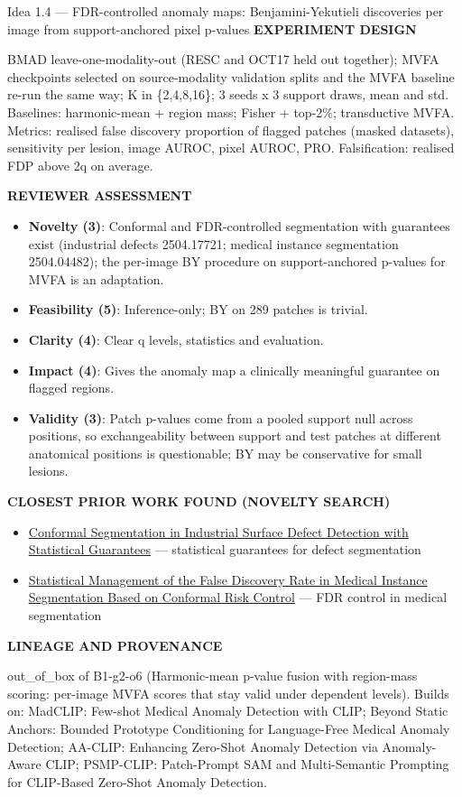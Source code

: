 \documentclass[11pt,a4paper]{article}
\newcommand{\lbl}[1]{{\sffamily\footnotesize\bfseries\color{muted}\MakeUppercase{#1}}\par}
\begin{document}
\begin{ideabox}{Idea 1.4 — FDR-controlled anomaly maps: Benjamini-Yekutieli discoveries per image from support-anchored pixel p-values}
\lbl{Experiment design}BMAD leave-one-modality-out (RESC and OCT17 held out together); MVFA checkpoints selected on source-modality validation splits and the MVFA baseline re-run the same way; K in \{2,4,8,16\}; 3 seeds x 3 support draws, mean and std. Baselines: harmonic-mean + region mass; Fisher + top-2\%; transductive MVFA. Metrics: realised false discovery proportion of flagged patches (masked datasets), sensitivity per lesion, image AUROC, pixel AUROC, PRO. Falsification: realised FDP above 2q on average.

\lbl{Reviewer assessment}\begin{itemize}[leftmargin=1.2em,itemsep=1pt,topsep=2pt]
\item \textbf{Novelty (3)}: Conformal and FDR-controlled segmentation with guarantees exist (industrial defects 2504.17721; medical instance segmentation 2504.04482); the per-image BY procedure on support-anchored p-values for MVFA is an adaptation.
\item \textbf{Feasibility (5)}: Inference-only; BY on 289 patches is trivial.
\item \textbf{Clarity (4)}: Clear q levels, statistics and evaluation.
\item \textbf{Impact (4)}: Gives the anomaly map a clinically meaningful guarantee on flagged regions.
\item \textbf{Validity (3)}: Patch p-values come from a pooled support null across positions, so exchangeability between support and test patches at different anatomical positions is questionable; BY may be conservative for small lesions.
\end{itemize}
\lbl{Closest prior work found (novelty search)}\begin{itemize}[leftmargin=1.2em,itemsep=1pt,topsep=2pt]
\item \href{https://arxiv.org/pdf/2504.17721}{Conformal Segmentation in Industrial Surface Defect Detection with Statistical Guarantees} — statistical guarantees for defect segmentation
\item \href{https://arxiv.org/html/2504.04482v2}{Statistical Management of the False Discovery Rate in Medical Instance Segmentation Based on Conformal Risk Control} — FDR control in medical segmentation
\end{itemize}
\lbl{Lineage and provenance}{\small out\_\allowbreak{}of\_\allowbreak{}box of B1-g2-o6 (Harmonic-mean p-value fusion with region-mass scoring: per-image MVFA scores that stay valid under dependent levels). Builds on: MadCLIP: Few-shot Medical Anomaly Detection with CLIP; Beyond Static Anchors: Bounded Prototype Conditioning for Language-Free Medical Anomaly Detection; AA-CLIP: Enhancing Zero-Shot Anomaly Detection via Anomaly-Aware CLIP; PSMP-CLIP: Patch-Prompt SAM and Multi-Semantic Prompting for CLIP-Based Zero-Shot Anomaly Detection.}
\end{ideabox}
\end{document}
